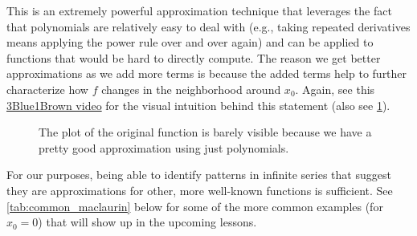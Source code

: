 \documentclass[12pt,english]{scrartcl}
\theoremstyle{definition}
\theoremstyle{remark}
\begin{document}
This is an extremely powerful approximation technique that leverages the fact
that polynomials are relatively easy to deal with (e.g., taking repeated
derivatives means applying the power rule over and over again) and can be
applied to functions that would be hard to directly compute. The reason we get
better approximations as we add more terms is because the added terms help to
further characterize how $f$ changes in the neighborhood around $x_{0}$. Again, see
this \href{https://youtu.be/3d6DsjIBzJ4}{3Blue1Brown video} for the visual
intuition behind this statement (also see \cref{fig:sine_maclaurin}).

\begin{figure}[ht]
    \centering
    \caption{The plot of the original function is barely visible because we have a pretty good approximation using just polynomials.}
    \label{fig:sine_maclaurin}
\end{figure}

For our purposes, being able to identify patterns in infinite series that
suggest they are approximations for other, more well-known functions is
sufficient. See \cref{tab:common_maclaurin} below for some of the more common
examples (for $x_{0}=0$) that will show up in the upcoming lessons.
\end{document}
